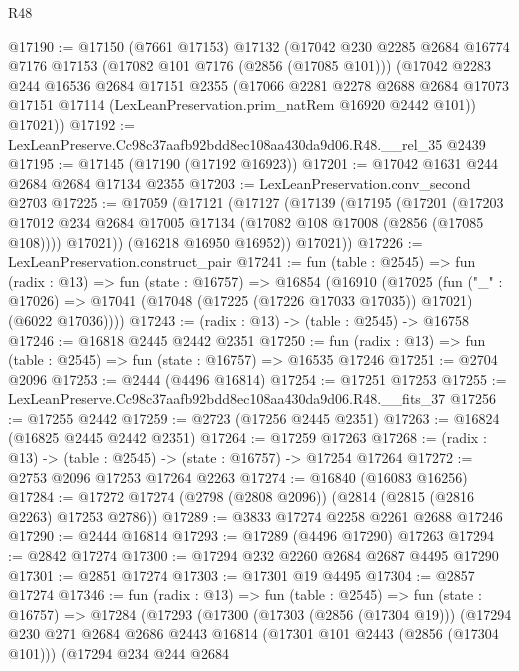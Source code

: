\begin{lexlean}{R48}
\begin{coremodule}
@17190 := @17150
    (@7661 @17153)
    @17132
    (@17042
      @230
      @2285
      @2684
      @16774
      @7176
      @17153
      (@17082 @101 @7176 (@2856 (@17085 @101)))
      (@17042
        @2283
        @244
        @16536
        @2684
        @17151
        @2355
        (@17066
          @2281
          @2278
          @2688
          @2684
          @17073
          @17151
          @17114
          (LexLeanPreservation.prim_natRem @16920 @2442 @101))
        @17021))
@17192 := LexLeanPreserve.Cc98c37aafb92bdd8ec108aa430da9d06.R48.__rel_35 @2439
@17195 := @17145 (@17190 (@17192 @16923))
@17201 := @17042 @1631 @244 @2684 @2684 @17134 @2355
@17203 := LexLeanPreservation.conv_second @2703
@17225 := @17059
    (@17121
      (@17127
        (@17139
          (@17195
            (@17201
              (@17203 @17012 @234 @2684 @17005 @17134 (@17082 @108 @17008 (@2856 (@17085 @108))))
              @17021))
          (@16218 @16950 @16952))
        @17021))
@17226 := LexLeanPreservation.construct_pair
@17241 := fun (table : @2545) =>
  fun (radix : @13) =>
  fun (state : @16757) =>
  @16854
    (@16910
      (@17025
        (fun ("_" : @17026) =>
        @17041 (@17048 (@17225 (@17226 @17033 @17035)) @17021) (@6022 @17036))))
@17243 := (radix : @13) -> (table : @2545) -> @16758
@17246 := @16818 @2445 @2442 @2351
@17250 := fun (radix : @13) => fun (table : @2545) => fun (state : @16757) => @16535 @17246
@17251 := @2704 @2096
@17253 := @2444 (@4496 @16814)
@17254 := @17251 @17253
@17255 := LexLeanPreserve.Cc98c37aafb92bdd8ec108aa430da9d06.R48.__fits_37
@17256 := @17255 @2442
@17259 := @2723 (@17256 @2445 @2351)
@17263 := @16824 (@16825 @2445 @2442 @2351)
@17264 := @17259 @17263
@17268 := (radix : @13) -> (table : @2545) -> (state : @16757) -> @17254 @17264
@17272 := @2753 @2096 @17253 @17264 @2263
@17274 := @16840 (@16083 @16256)
@17284 := @17272 @17274 (@2798 (@2808 @2096)) (@2814 (@2815 (@2816 @2263) @17253 @2786))
@17289 := @3833 @17274 @2258 @2261 @2688 @17246
@17290 := @2444 @16814
@17293 := @17289 (@4496 @17290) @17263
@17294 := @2842 @17274
@17300 := @17294 @232 @2260 @2684 @2687 @4495 @17290
@17301 := @2851 @17274
@17303 := @17301 @19 @4495
@17304 := @2857 @17274
@17346 := fun (radix : @13) =>
  fun (table : @2545) =>
  fun (state : @16757) =>
  @17284
    (@17293
      (@17300
        (@17303 (@2856 (@17304 @19)))
        (@17294
          @230
          @271
          @2684
          @2686
          @2443
          @16814
          (@17301 @101 @2443 (@2856 (@17304 @101)))
          (@17294
            @234
            @244
            @2684

\end{coremodule}
\end{lexlean}
